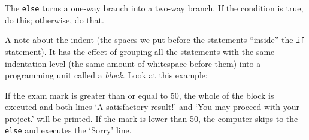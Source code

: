 
The  \verb!else! turns a one-way branch into a two-way branch.  If the
condition is true, do this; otherwise, do that.






A note about the indent (the spaces we put before the statements
``inside'' the \texttt{if} statement). It has the effect of
grouping all the statements with the same indentation level (the same
amount of whitespace before them) into a programming unit called a
\emph{block}.
Look at this example: 
\pagebreak


If the exam mark is greater than or equal to 50, 
the whole of the block is executed and both
lines `A satisfactory result!' and `You may proceed with your
project.' will be printed.  If the mark is lower than 50, 
the computer skips to
the \verb!else! and executes the `Sorry' line.


